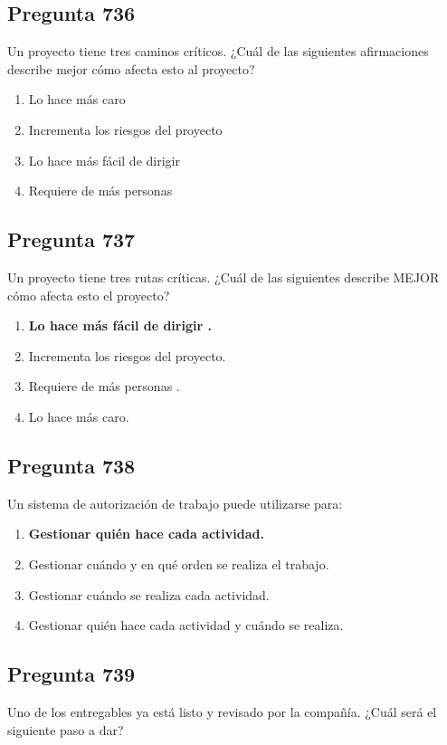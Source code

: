 \documentclass[11pt,a4paper]{article}
\begin{document}
\subsection*{Pregunta 736}
Un proyecto tiene tres caminos críticos. ¿Cuál de las siguientes afirmaciones describe mejor cómo afecta esto al proyecto?

\begin{enumerate}[label=\alph*)]
  \item Lo hace más caro
  \item Incrementa los riesgos del proyecto
  \item Lo hace más fácil de dirigir
  \item Requiere de más personas
\end{enumerate}

\subsection*{Pregunta 737}
Un proyecto tiene tres rutas críticas. ¿Cuál de las siguientes describe MEJOR cómo afecta esto el proyecto?

\begin{enumerate}[label=\alph*)]
  \item \textbf{Lo hace más fácil de dirigir .}
  \item Incrementa los riesgos del proyecto.
  \item Requiere de más personas .
  \item Lo hace más caro.
\end{enumerate}

\subsection*{Pregunta 738}
Un sistema de autorización de trabajo puede utilizarse para:

\begin{enumerate}[label=\alph*)]
  \item \textbf{Gestionar quién hace cada actividad.}
  \item Gestionar cuándo y en qué orden se realiza el trabajo.
  \item Gestionar cuándo se realiza cada actividad.
  \item Gestionar quién hace cada actividad y cuándo se realiza.
\end{enumerate}

\subsection*{Pregunta 739}
Uno de los entregables ya está listo y revisado por la compañía. ¿Cuál será el siguiente paso a dar?
\end{document}
